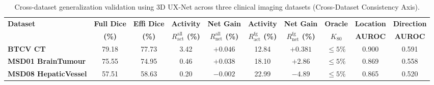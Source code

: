 \begin{table}[t]
\centering
\caption{Cross-dataset generalization validation using 3D UX-Net across three clinical imaging datasets (Cross-Dataset Consistency Axis).}
\label{tab:cross_dataset}
\footnotesize
\begin{tabular*}{\textwidth}{@{\extracolsep{\fill}}lccccccccc}
\toprule
\textbf{Dataset} & \textbf{Full Dice} & \textbf{Effi Dice} & \textbf{Activity} & \textbf{Net Gain} & \textbf{Activity} & \textbf{Net Gain} & \textbf{Oracle} & \textbf{Location} & \textbf{Direction} \\
 & \textbf{(\%)} & \textbf{(\%)} & \textbf{$R_{\text{act}}^{\text{all}}$ (\%)} & \textbf{$R_{\text{net}}^{\text{all}}$ (\%)} & \textbf{$R_{\text{act}}^{\text{fg}}$ (\%)} & \textbf{$R_{\text{net}}^{\text{fg}}$ (\%)} & \textbf{$K_{80}$} & \textbf{AUROC} & \textbf{AUROC} \\
\midrule
\textbf{BTCV CT} & 79.18 & 77.73 & 3.42 & $+0.046$ & 12.84 & $+0.381$ & $\le 5\%$ & 0.900 & 0.591 \\
\textbf{MSD01 BrainTumour} & 75.55 & 74.95 & 0.46 & $+0.038$ & 18.10 & $+2.86$ & $\le 5\%$ & 0.869 & 0.558 \\
\textbf{MSD08 HepaticVessel} & 57.51 & 58.63 & 0.20 & $-0.002$ & 22.99 & $-4.89$ & $\le 5\%$ & 0.865 & 0.520 \\
\bottomrule
\end{tabular*}
\end{table}

